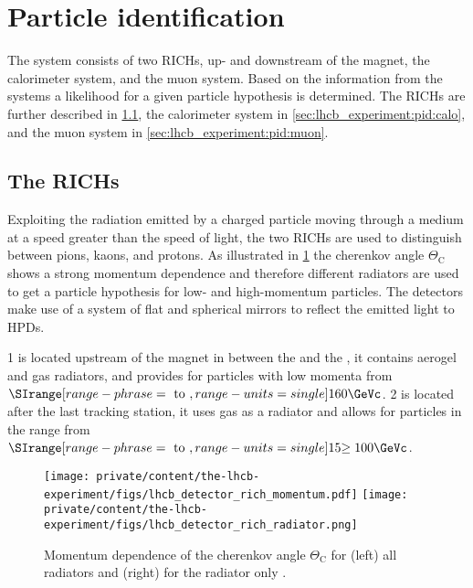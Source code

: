 \section{Particle identification}
\label{sec:lhcb_experiment:pid}

The \LHCb \PID system consists of two \acp{RICH}, up- and downstream of the
magnet, the calorimeter system, and the muon system. Based on the information
from the \PID systems a likelihood for a given particle hypothesis is
determined. The \acp{RICH} are further described in
\cref{sec:lhcb_experiment:pid:rich}, the calorimeter system in
\cref{sec:lhcb_experiment:pid:calo}, and the muon system in
\cref{sec:lhcb_experiment:pid:muon}.

\subsection{The \aclp*{RICH}}
\label{sec:lhcb_experiment:pid:rich}

Exploiting the radiation emitted by a charged particle moving through a medium
at a speed greater than the speed of light, the two \acp{RICH} are used to
distinguish between pions, kaons, and protons. As illustrated in
\cref{fig:lhcb_experiment:tracking:pid:radiator} the cherenkov angle
$\Theta_\mathrm{C}$ shows a strong momentum dependence and therefore different
radiators are used to get a particle hypothesis for low- and high-momentum
particles. The detectors make use of a system of flat and spherical mirrors to
reflect the emitted light to \acp{HPD}.

\RICH{}1 is located upstream of the magnet in between the \VELO and the \TT, it
contains aerogel and \fluorocarbonfour gas radiators, and provides \PID for
particles with low momenta from $\SIrange[range-phrase = \text{ to },range-units
= single]{1}{60}{\GeVc}$. \RICH{}2 is located after the last tracking station,
it uses \fluorocarbon gas as a radiator and allows \PID for particles in the
range from $\SIrange[range-phrase = \text{ to },range-units =
single]{15}{\geq100}{\GeVc}$.
%
\begin{figure}[t]
  \texttt{[image: private/content/the-lhcb-experiment/figs/lhcb\_detector\_rich\_momentum.pdf]}
  \texttt{[image: private/content/the-lhcb-experiment/figs/lhcb\_detector\_rich\_radiator.png]}
  \caption{Momentum dependence of the cherenkov angle $\Theta_\mathrm{C}$ for
  (left) all \RICH radiators \cite{Alves:2008zz} and (right) for the
  \fluorocarbonfour radiator only \cite{Adinolfi:2012qfa}.}
  \label{fig:lhcb_experiment:tracking:pid:radiator}
\end{figure}

